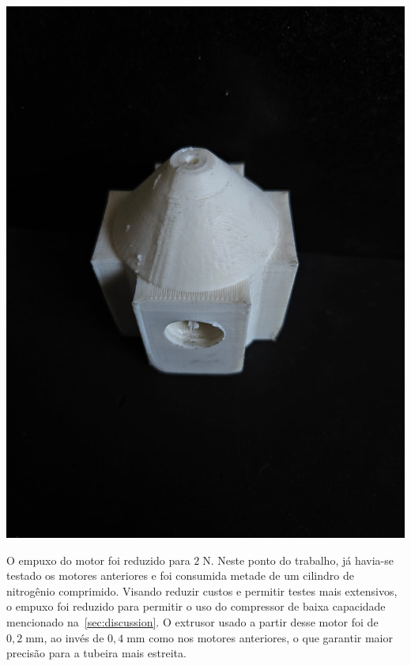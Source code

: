 \begin{minipage}{.49\textwidth}
    \includegraphics[width=\textwidth]{img/app_dev_history/motor5.jpeg}
\end{minipage}
\begin{minipage}{.49\textwidth}
    O empuxo do motor foi reduzido para \(2\;\mathrm{N}\). Neste ponto do trabalho, já havia-se testado os motores anteriores e foi consumida metade de um cilindro de nitrogênio comprimido. Visando reduzir custos e permitir testes mais extensivos, o empuxo foi reduzido para permitir o uso do compressor de baixa capacidade mencionado na~\ref{sec:discussion}. O extrusor usado a partir desse motor foi de \(0,2\;\mathrm{mm}\), ao invés de \(0,4\;\mathrm{mm}\) como nos motores anteriores, o que garantir maior precisão para a tubeira mais estreita. 
\end{minipage}

